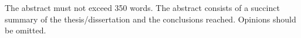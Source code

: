 The abstract must not exceed 350 words.
The abstract consists of a succinct summary of the thesis/dissertation and the conclusions reached.
Opinions should be omitted.